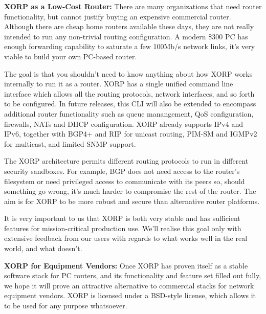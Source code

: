 \vspace{0.1in}\noindent\textbf{XORP as a Low-Cost Router:}
There are many organizations that need router functionality, but
cannot justify buying an expensive commercial router.  Although there
are cheap home routers available these days, they are not really
intended to run any non-trivial routing configuration.  A modern \$300
PC has enough forwarding capability to saturate a few 100Mb/s network
links, it's very viable to build your own PC-based router.

The goal is that you shouldn't need to know anything about how XORP
works internally to run it as a router.  XORP has a single unified
command line interface which allows all the routing protocols, network
interfaces, and so forth to be configured.  In future releases, this
CLI will also be extended to encompass additional router functionality
such as queue manangement, QoS configuration, firewalls, NATs and DHCP
configuration. XORP already supports IPv4 and IPv6, together with BGP4+ and RIP for
unicast routing, PIM-SM and IGMPv2 for multicast, and limited SNMP
support.  


The XORP architecture permits different
routing protocols to run in different security sandboxes.  For
example, BGP does not need access to the router's filesystem or need
privileged access to communicate with its peers so, should something
go wrong, it's much harder to compromise the rest of the router.  The
aim is for XORP to be more robust and secure than alternative router
platforms.

It is very important to us that XORP is both very stable and has
sufficient features for mission-critical production use.  We'll
realise this goal only with extensive feedback from our users with
regards to what works well in the real world, and what doesn't.


\vspace{0.1in}\noindent\textbf{XORP for Equipment Vendors:}
Once XORP has proven itself as a stable software stack for PC routers,
and its functionality and feature set filled out fully, we hope it
will prove an attractive alternative to commercial stacks for network
equipment vendors. XORP is licensed under a BSD-style license, which allows it to be used
for any purpose whatsoever. %

